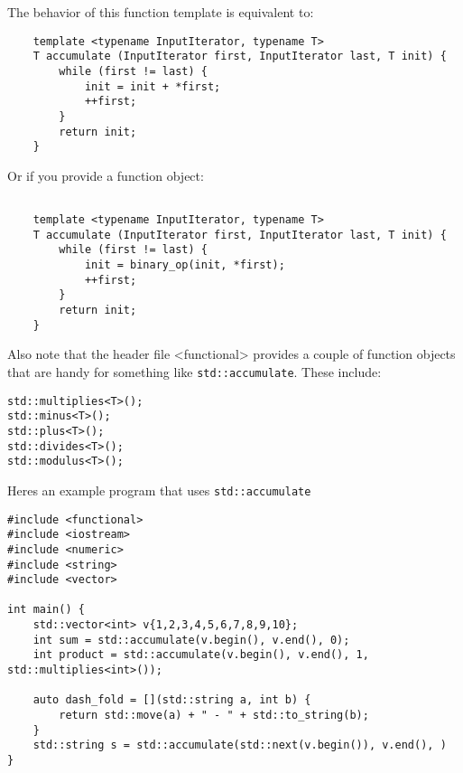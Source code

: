\documentclass{report}
\begin{document}
        \bigbreak \noindent
    The behavior of this function template is equivalent to:
    \begin{verbatim}
    template <typename InputIterator, typename T> 
    T accumulate (InputIterator first, InputIterator last, T init) {
        while (first != last) {
            init = init + *first;
            ++first;
        }
        return init;
    }
    \end{verbatim}
    Or if you provide a function object:
    \begin{verbatim}
     
    template <typename InputIterator, typename T> 
    T accumulate (InputIterator first, InputIterator last, T init) {
        while (first != last) {
            init = binary_op(init, *first);
            ++first;
        }
        return init;
    }
    \end{verbatim}
Also note that the header file <functional> provides a couple of function objects that are handy for something like \texttt{std::accumulate}. These include:
\begin{verbatim}
std::multiplies<T>();
std::minus<T>();
std::plus<T>();
std::divides<T>();
std::modulus<T>();
\end{verbatim}
Heres an example program that uses \texttt{std::accumulate}
\begin{verbatim}
#include <functional>
#include <iostream>
#include <numeric>
#include <string>
#include <vector>

int main() {
    std::vector<int> v{1,2,3,4,5,6,7,8,9,10};
    int sum = std::accumulate(v.begin(), v.end(), 0);
    int product = std::accumulate(v.begin(), v.end(), 1, std::multiplies<int>());

    auto dash_fold = [](std::string a, int b) {
        return std::move(a) + " - " + std::to_string(b);
    }
    std::string s = std::accumulate(std::next(v.begin()), v.end(), )
}
\end{verbatim}
\end{document}
